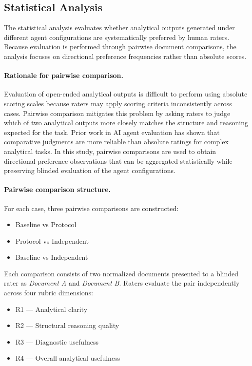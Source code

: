 \subsection{Statistical Analysis}
\label{sec:power}

The statistical analysis evaluates whether analytical outputs generated under
different agent configurations are systematically preferred by human raters.
Because evaluation is performed through pairwise document comparisons, the
analysis focuses on directional preference frequencies rather than absolute
scores.

\paragraph{Rationale for pairwise comparison.}

Evaluation of open-ended analytical outputs is difficult to perform using
absolute scoring scales because raters may apply scoring criteria
inconsistently across cases. Pairwise comparison mitigates this problem by
asking raters to judge which of two analytical outputs more closely matches
the structure and reasoning expected for the task. Prior work in AI agent
evaluation has shown that comparative judgments are more reliable than
absolute ratings for complex analytical tasks. In this study, pairwise
comparisons are used to obtain directional preference observations that can
be aggregated statistically while preserving blinded evaluation of the
agent configurations.
\paragraph{Pairwise comparison structure.}

For each case, three pairwise comparisons are constructed:

\begin{itemize}
\item Baseline vs Protocol
\item Protocol vs Independent
\item Baseline vs Independent
\end{itemize}

Each comparison consists of two normalized documents presented to a blinded
rater as \textit{Document A} and \textit{Document B}. Raters evaluate the pair
independently across four rubric dimensions:

\begin{itemize}
\item R1 — Analytical clarity
\item R2 — Structural reasoning quality
\item R3 — Diagnostic usefulness
\item R4 — Overall analytical usefulness
\end{itemize}


